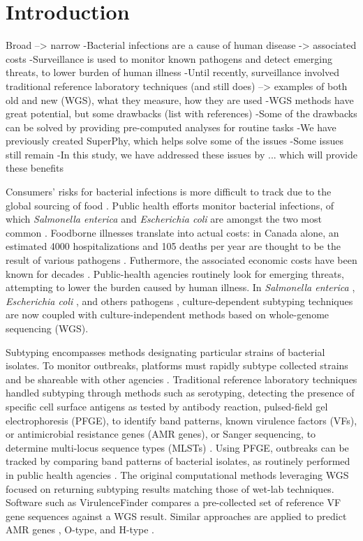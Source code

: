 \documentclass[a4,center,fleqn]{NAR}
\begin{document}
\section{Introduction}
Broad --> narrow
-Bacterial infections are a cause of human disease -> associated costs
-Surveillance is used to monitor known pathogens and detect emerging threats, to lower burden of human illness
-Until recently, surveillance involved traditional reference laboratory techniques (and still does) --> examples of both old and new (WGS), what they measure, how they are used
-WGS methods have great potential, but some drawbacks (list with references)
-Some of the drawbacks can be solved by providing pre-computed analyses for routine tasks
-We have previously created SuperPhy, which helps solve some of the issues
-Some issues still remain
-In this study, we have addressed these issues by ... which will provide these benefits

Consumers' risks for bacterial infections is more difficult to track due to the global sourcing of food \cite{kozak2013foodborne}.
Public health efforts monitor bacterial infections, of which \textit{Salmonella enterica} and \textit{Escherichia coli} are amongst the two most common \cite{kozak2013foodborne}.
Foodborne illnesses translate into actual costs: in Canada alone, an estimated 4000 hospitalizations and 105 deaths per year are thought to be the result of various pathogens \cite{thomas2015estimates}.
Futhermore, the associated economic costs have been known for decades \cite{todd1989costs}.
Public-health agencies routinely look for emerging threats, attempting to lower the burden caused by human illness.
In \textit{Salmonella enterica} \cite{bell2016recent}, \textit{Escherichia coli} \cite{fratamico2016advances}, and others pathogens \cite{ronholm2016navigating}, culture-dependent subtyping techniques are now coupled with culture-independent methods based on whole-genome sequencing (WGS).

Subtyping encompasses methods designating particular strains of bacterial isolates.
To monitor outbreaks, platforms must rapidly subtype collected strains and be shareable with other agencies \cite{ronholm2016navigating}. 
Traditional reference laboratory techniques handled subtyping through methods such as serotyping, detecting the presence of specific cell surface antigens as tested by antibody reaction, pulsed-field gel electrophoresis (PFGE), to identify band patterns, known virulence factors (VFs), or antimicrobial resistance genes (AMR genes), or Sanger sequencing, to determine multi-locus sequence types (MLSTs) \cite{ronholm2016navigating}.
Using PFGE, outbreaks can be tracked by comparing band patterns of bacterial isolates, as routinely performed in public health agencies \cite{kozak2013foodborne}. 
The original computational methods leveraging WGS focused on returning subtyping results matching those of wet-lab techniques.
Software such as VirulenceFinder \cite{joensen2014real} compares a pre-collected set of reference VF gene sequences against a WGS result.
Similar approaches are applied to predict AMR genes \cite{mcarthur2013comprehensive}, O-type, and H-type \cite{whiteside2016superphy}. 
\end{document}
